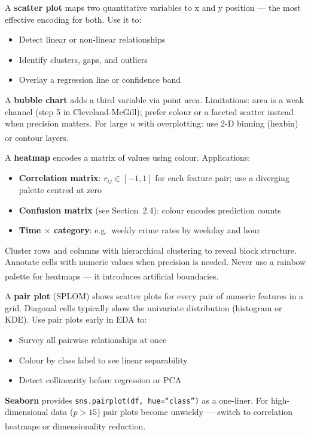 \begin{tcbitemize}[ skin=sectionraster ]
    \tcbitem[title={Scatter Plots and Bubble Charts}, raster multicolumn=3]
    A \textbf{scatter plot} maps two quantitative variables to x and y position ---
    the most effective encoding for both. Use it to:
    \begin{itemize}
        \item Detect linear or non-linear relationships
        \item Identify clusters, gaps, and outliers
        \item Overlay a regression line or confidence band
    \end{itemize}
    A \textbf{bubble chart} adds a third variable via point area. Limitations:
    area is a weak channel (step 5 in Cleveland-McGill); prefer colour or
    a faceted scatter instead when precision matters.
    For large $n$ with overplotting: use 2-D binning (hexbin) or contour
    layers\textsuperscript{\cite[][pp.~80--90]{brucePracticalStatisticsData2017}}.

    \tcbitem[title={Heatmaps and Correlation Matrices}, raster multicolumn=3]
    A \textbf{heatmap} encodes a matrix of values using colour. Applications:
    \begin{itemize}
        \item \textbf{Correlation matrix}: $r_{ij} \in [-1, 1]$ for each feature pair;
              use a diverging palette centred at zero
        \item \textbf{Confusion matrix} (see Section~2.4): colour encodes prediction counts
        \item \textbf{Time $\times$ category}: e.g.\ weekly crime rates by weekday and hour
    \end{itemize}
    Cluster rows and columns with hierarchical clustering to reveal block structure.
    Annotate cells with numeric values when precision is needed.
    Never use a rainbow palette for heatmaps --- it introduces artificial
    boundaries\textsuperscript{\cite[][pp.~148--160]{molinHandsonDataAnalysis2021}}.

    \tcbitem[title={Pair Plots (Scatterplot Matrix)}, raster multicolumn=6]
    A \textbf{pair plot} (SPLOM) shows scatter plots for every pair of numeric features in a
    grid. Diagonal cells typically show the univariate distribution (histogram or KDE).
    Use pair plots early in EDA to:
    \begin{itemize}
        \item Survey all pairwise relationships at once
        \item Colour by class label to see linear separability
        \item Detect collinearity before regression or PCA
    \end{itemize}
    \textbf{Seaborn} provides \texttt{sns.pairplot(df, hue=``class'')} as a one-liner.
    For high-dimensional data ($p > 15$) pair plots become unwieldy --- switch to
    correlation heatmaps or dimensionality
    reduction\textsuperscript{\cite[][pp.~161--165]{molinHandsonDataAnalysis2021}}.
\end{tcbitemize}

